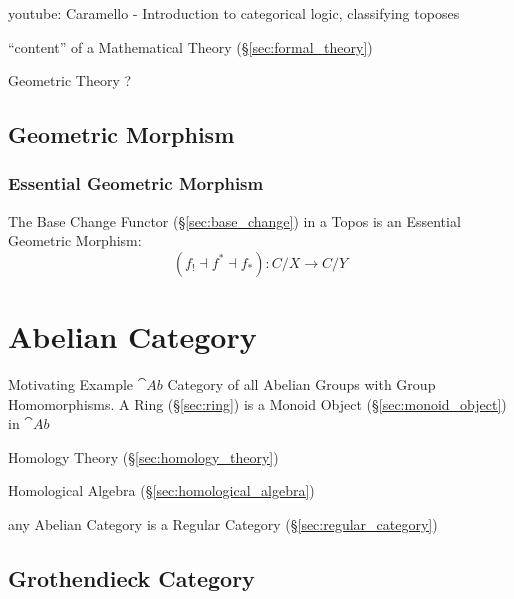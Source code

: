 youtube: Caramello - Introduction to categorical logic, classifying
toposes

``content'' of a Mathematical Theory (\S\ref{sec:formal_theory})

Geometric Theory ?



\subsection{Geometric Morphism}\label{sec:geometric_morphism}

\subsubsection{Essential Geometric Morphism}
\label{sec:essential_geometric}

The Base Change Functor (\S\ref{sec:base_change}) in a Topos is an
Essential Geometric Morphism:
\[
  (f_! \dashv f^* \dashv f_*):C/X \rightarrow C/Y
\]



\section{Abelian Category}\label{sec:abelian_category}

Motivating Example $\cat{Ab}$ Category of all Abelian Groups with
Group Homomorphisms. A Ring (\S\ref{sec:ring}) is a Monoid Object
(\S\ref{sec:monoid_object}) in $\cat{Ab}$

Homology Theory (\S\ref{sec:homology_theory})

Homological Algebra (\S\ref{sec:homological_algebra})

any Abelian Category is a Regular Category
(\S\ref{sec:regular_category})



\subsection{Grothendieck Category}\label{sec:grothendieck_category}

